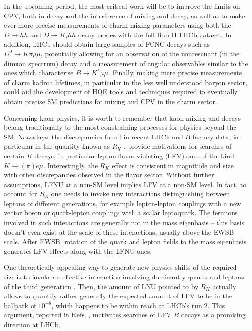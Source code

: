 In the upcoming period, the most critical work will be to improve the limits on CPV, both in decay and the interference of mixing and decay, as well as to make ever more precise measurements of charm mixing parameters using both the $D\to hh$ and $D\to K_s hh$ decay modes with the full Run II LHCb dataset. In addition, LHCb should obtain large samples of FCNC decays such as $D^0\to K \pi\mu\mu$, potentially allowing for an observation of the nonresonant (in the dimuon spectrum) decay and a measurement of angular observables similar to the ones which characterise $B\to K^*\mu\mu$. Finally, making more precise measurements of charm hadron lifetimes, in particular in the less well understood baryon sector, could aid the development of HQE tools and techniques required to eventually obtain precise SM predictions for mixing and CPV in the charm sector.


Concerning kaon physics, it is worth to remember that kaon mixing and decays belong traditionally to the most constraining processes for physics beyond the SM. Nowadays, the discrepancies found in recent LHCb and $B$-factory data, in particular in the quantity known as $R_K$ \cite{Aaij:2014ora},  provide motivations for searches of certain $K$ decays, in particular lepton-flavor violating (LFV) ones of the kind $K \to (\pi) e \mu$.  Interestingly, the $R_K$ effect is consistent in magnitude and size with other discrepancies observed in the flavor sector. Without further assumptions, LFNU at a non-SM level implies LFV at a non-SM level. In fact, to account for $R_K$ one needs to invoke new interactions distinguishing between leptons of different generations, for example lepton-lepton couplings with a new vector boson or quark-lepton couplings with a scalar leptoquark. The fermions involved in such interactions are generally not in the mass eigenbasis -- this basis doesn't even exist at the scale of these interactions, usually above the EWSB scale. After EWSB, rotation of the quark and lepton fields to the mass eigenbasis generates LFV effects along with the LFNU ones.

One theoretically appealing way to generate new-physics shifts of the required size is to invoke an effective interaction involving dominantly quarks and leptons of the third generation \cite{Glashow:2014iga}. Then, the amount of LNU pointed to by $R_K$ actually allows to quantify rather generally the expected amount of LFV to be in the ballpark of $10^{-8}$, which happens to be within reach at LHCb's run 2. This argument, reported in Refs. \cite{Guadagnoli:2016erb,Glashow:2014iga}, motivates searches of LFV $B$ decays as a promising direction at LHCb.

